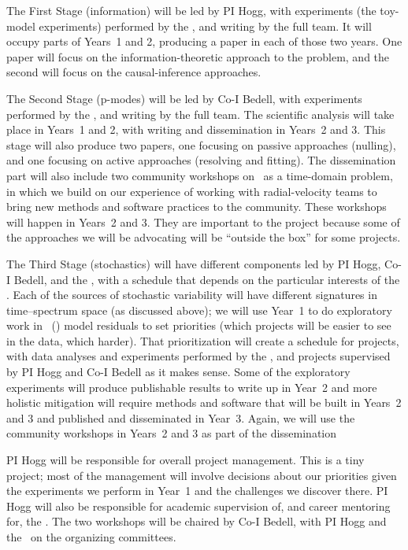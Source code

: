 \documentclass[12pt, letterpaper]{article}
\begin{document}
The First Stage (information) will be led by PI Hogg, with experiments (the
toy-model experiments) performed by the \GRA, and writing by the full
team.
It will occupy parts of Years~1 and 2, producing a paper
in each of those two years.
One paper will focus on the information-theoretic approach to the problem,
and the second will focus on the causal-inference approaches.

The Second Stage (p-modes) will be led by Co-I Bedell, with
experiments performed by the \GRA, and writing by the full team.
The scientific analysis will take place in Years~1 and 2, with
writing and dissemination in Years~2 and 3.
This stage will also produce two papers, one focusing on passive
approaches (nulling), and one focusing on active approaches (resolving
and fitting).
The dissemination part will also include two community workshops on
\EPRV\ as a time-domain problem, in which we build on our experience
of working with radial-velocity teams to bring new methods and
software practices to the community.
These workshops will happen in Years~2 and 3.
They are important to the project because some of the approaches we
will be advocating will be ``outside the box'' for some projects.

The Third Stage (stochastics) will have different components led by PI
Hogg, Co-I Bedell, and the \GRA, with a schedule that depends on the
particular interests of the \GRA.
Each of the sources of stochastic variability will have different
signatures in time--spectrum space (as discussed above); we will use
Year~1 to do exploratory work in \wobble\ (\citealt{Bedell2019})
model residuals to set priorities
(which projects will be easier to see in the data, which harder).
That prioritization will create a schedule for projects, with data
analyses and experiments performed by the \GRA, and projects supervised
by PI Hogg and Co-I Bedell as it makes sense.
Some of the exploratory experiments will produce publishable results
to write up in Year~2 and more holistic mitigation will require
methods and software that will be built in Years~2 and 3 and published
and disseminated in Year~3.
Again, we will use the community workshops in Years~2 and 3 as part of
the dissemination

PI Hogg will be responsible for overall project management. This is a
tiny project; most of the management will involve decisions about our
priorities given the experiments we perform in Year~1 and the
challenges we discover there.
PI Hogg will also be responsible for academic supervision of, and
career mentoring for, the \GRA.
The two workshops will be chaired by Co-I Bedell, with PI Hogg and
the \GRA\ on the organizing committees.
\end{document}
